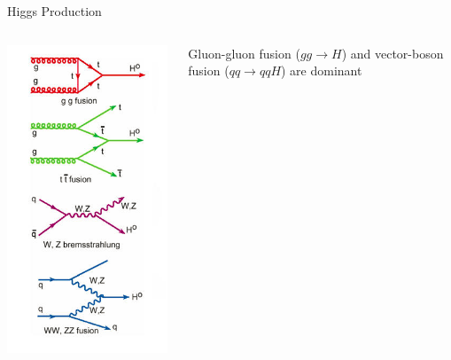 \begin{frame}{Higgs Production}
\begin{center}
\begin{columns}
\begin{column}{0.35\textwidth}
    \includegraphics[width=0.99\textwidth]{images/higgs_production_feynman.png}
  \end{column}
  \begin{column}{0.65\textwidth}
    Gluon-gluon fusion ($gg \rightarrow H$) and vector-boson fusion ($qq \rightarrow qqH$) are dominant

\end{column}
\end{columns}
\end{center}
\end{frame}
